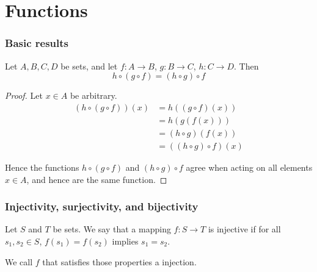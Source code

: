 \chapter{Functions}\label{afadab8}

\begin{toc}
\end{toc}

\subsection{Basic results}\label{df4bc04}

\label{ecb536b}

Let $A,B,C,D$ be sets, and let $f:A\to B$, $g:B\to C$, $h:C\to D$. Then
$$
  h\circ(g\circ f)=(h\circ g)\circ f
$$

\begin{proof}
  Let $x\in A$ be arbitrary.
  \begin{align*}
    (h\circ(g\circ f))(x) &=h((g\circ f)(x))       \\
                          &=h(g(f(x)))             \\
                          &=(h\circ g)(f(x))       \\
                          &=((h\circ g)\circ f)(x)
  \end{align*}

  Hence the functions $h\circ(g\circ f)$ and $(h\circ g)\circ f$ agree when
  acting on all elements $x\in A$, and hence are the same function.
\end{proof}

\subsection{Injectivity, surjectivity, and bijectivity}\label{fd84935}

\label{ac44d1d}

Let $S$ and $T$ be sets. We say that a mapping $f:S\to T$ is injective if for
all $s_1,s_2\in S$, $f(s_1)=f(s_2)$ implies $s_1=s_2$.

We call $f$ that satisfies those properties a injection.

\label{bd75843}

